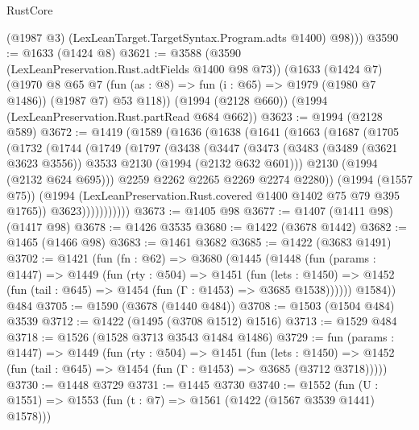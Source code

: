 \begin{lexlean}{RustCore}
\begin{coremodule}
          (@1987 @3)
          (LexLeanTarget.TargetSyntax.Program.adts @1400)
          @98)))
@3590 := @1633 (@1424 @8)
@3621 := @3588
    (@3590 (LexLeanPreservation.Rust.adtFields @1400 @98 @73))
    (@1633
      (@1424 @7)
      (@1970
        @8
        @65
        @7
        (fun (as : @8) => fun (i : @65) => @1979 (@1980 @7 @1486))
        (@1987 @7)
        @53
        @118))
    (@1994 (@2128 @660))
    (@1994 (LexLeanPreservation.Rust.partRead @684 @662))
@3623 := @1994 (@2128 @589)
@3672 := @1419
    (@1589
      (@1636
        (@1638
          (@1641
            (@1663
              (@1687
                (@1705
                  (@1732
                    (@1744
                      (@1749
                        (@1797
                          (@3438
                            (@3447
                              (@3473
                                (@3483
                                  (@3489 (@3621 @3623 @3556))
                                  @3533
                                  @2130
                                  (@1994 (@2132 @632 @601)))
                                @2130
                                (@1994 (@2132 @624 @695)))
                              @2259
                              @2262
                              @2265
                              @2269
                              @2274
                              @2280))
                          (@1994 (@1557 @75))
                          (@1994 (LexLeanPreservation.Rust.covered @1400 @1402 @75 @79 @395 @1765))
                          @3623)))))))))))
@3673 := @1405 @98
@3677 := @1407 (@1411 @98) (@1417 @98)
@3678 := @1426 @3535
@3680 := @1422 (@3678 @1442)
@3682 := @1465 (@1466 @98)
@3683 := @1461 @3682
@3685 := @1422 (@3683 @1491)
@3702 := @1421
    (fun (fn : @62) =>
    @3680
      (@1445
        (@1448
          (fun (params : @1447) =>
          @1449
            (fun (rty : @504) =>
            @1451
              (fun (lets : @1450) =>
              @1452 (fun (tail : @645) => @1454 (fun (Γ : @1453) => @3685 @1538))))))
        @1584))
    @484
@3705 := @1590 (@3678 (@1440 @484))
@3708 := @1503 (@1504 @484) @3539
@3712 := @1422 (@1495 (@3708 @1512) @1516)
@3713 := @1529 @484
@3718 := @1526 (@1528 @3713 @3543 @1484 @1486)
@3729 := fun (params : @1447) =>
  @1449
    (fun (rty : @504) =>
    @1451
      (fun (lets : @1450) =>
      @1452 (fun (tail : @645) => @1454 (fun (Γ : @1453) => @3685 (@3712 @3718)))))
@3730 := @1448 @3729
@3731 := @1445 @3730
@3740 := @1552 (fun (U : @1551) => @1553 (fun (t : @7) => @1561 (@1422 (@1567 @3539 @1441) @1578)))

\end{coremodule}
\end{lexlean}
